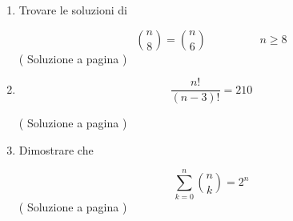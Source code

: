 \begin{enumerate}
\item

Trovare le soluzioni di

\begin{equation*}
\binom{n}{8}=\binom{n}{6} \hspace{2cm} n \geq 8
\end{equation*}
( Soluzione a pagina \pageref{combs_01} \label{combl_01} )



\item 

\begin{equation*}
\frac{n!}{(n-3)!} = 210
\end{equation*}

( Soluzione a pagina \pageref{combs_02} \label{combl_02} )

\item
Dimostrare che 

\begin{equation*}
\sum_{k=0}^{n}{\binom{n}{k}}=2^n
\end{equation*}
( Soluzione a pagina \pageref{combs_03} \label{combl_03} )
\end{enumerate}
